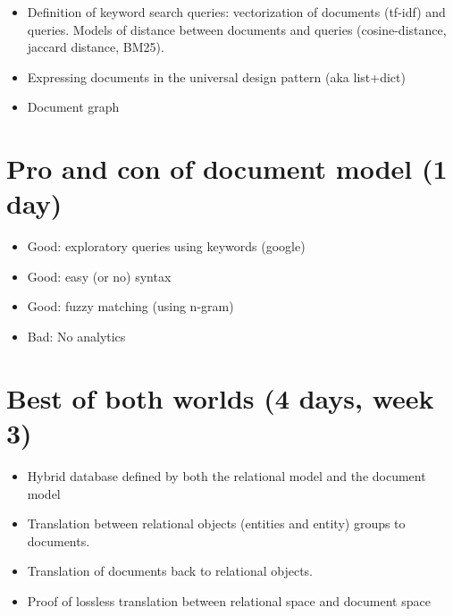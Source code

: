 	\begin{itemize}
		\item Definition of keyword search queries: vectorization of documents (tf-idf) and queries.  Models of distance between documents and queries (cosine-distance, jaccard distance, BM25).
		\item Expressing documents in the universal design pattern (aka list+dict)
		\item Document graph
	\end{itemize}

\section{Pro and con of document model (1 day)}
	\begin{itemize}
		\item Good: exploratory queries using keywords (google)
		\item Good: easy (or no) syntax
		\item Good: fuzzy matching (using n-gram)
		\item Bad: No analytics
	\end{itemize}
		
		\section{Best of both worlds (4 days, week 3)}
	\begin{itemize}
		\item Hybrid database defined by both the relational model and the document model
		\item Translation between relational objects (entities and entity) groups to documents.
		\item Translation of documents back to relational objects.
		\item Proof of lossless translation between relational space and document space
	\end{itemize}